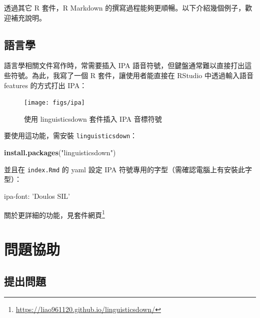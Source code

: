 \documentclass[oneside]{book}
\newenvironment{Shaded}{\begin{snugshade}}{\end{snugshade}}
\newcommand{\AttributeTok}[1]{\textcolor[rgb]{0.77,0.63,0.00}{#1}}
\newcommand{\FunctionTok}[1]{\textcolor[rgb]{0.00,0.00,0.00}{#1}}
\newcommand{\KeywordTok}[1]{\textcolor[rgb]{0.13,0.29,0.53}{\textbf{#1}}}
\newcommand{\NormalTok}[1]{#1}
\newcommand{\StringTok}[1]{\textcolor[rgb]{0.31,0.60,0.02}{#1}}
\renewcommand{\href}[2]{#2\footnote{\url{#1}}}
\theoremstyle{definition}
\theoremstyle{definition}
\theoremstyle{definition}
\theoremstyle{remark}
\begin{document}
透過其它 R 套件，R Markdown 的撰寫過程能夠更順暢。以下介紹幾個例子，歡迎補充說明。

\hypertarget{ling}{%
\section{語言學}\label{ling}}

語言學相關文件寫作時，常需要插入 IPA 語音符號，但鍵盤通常難以直接打出這些符號。為此，我寫了一個 R 套件，讓使用者能直接在 RStudio 中透過輸入語音 features 的方式打出 IPA：

\begin{figure}

{\centering \texttt{[image: figs/ipa]} 

}

\caption{使用 linguisticsdown 套件插入 IPA 音標符號}\label{fig:unnamed-chunk-8}
\end{figure}

要使用這功能，需安裝 \texttt{linguisticsdown}：

\begin{Shaded}
\begin{Highlighting}[]
\KeywordTok{install.packages}\NormalTok{(}\StringTok{"linguisticsdown"}\NormalTok{)}
\end{Highlighting}
\end{Shaded}

並且在 \texttt{index.Rmd} 的 yaml 設定 IPA 符號專用的字型（需確認電腦上有安裝此字型）：

\begin{Shaded}
\begin{Highlighting}[]
\FunctionTok{ipa-font:}\AttributeTok{ }\StringTok{'Doulos SIL'}
\end{Highlighting}
\end{Shaded}

關於更詳細的功能，見\href{https://liao961120.github.io/linguisticsdown/}{套件網頁}

\hypertarget{feed-back}{%
\chapter*{問題協助}\label{feed-back}}

\hypertarget{issue}{%
\section*{提出問題}\label{issue}}
\end{document}
